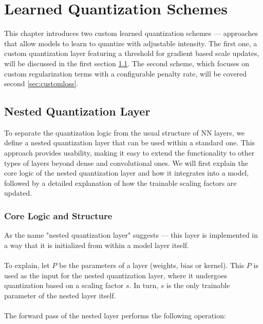 \chapter{Learned Quantization\label{cha:chapter3} Schemes}
This chapter introduces two custom learned quantization schemes — approaches that allow models to learn to quantize
with adjustable intensity. The first one, a custom quantization layer featuring a threshold for gradient based scale updates,
will be discussed in the first section \ref{sec:nestedquantizationlayer}. The second scheme, which focuses on custom regularization terms with a configurable penalty rate,
will be covered second \ref{sec:customloss}.


\section{Nested Quantization Layer}
\label{sec:nestedquantizationlayer}
To separate the quantization logic from the usual structure of NN layers,
we define a nested quantization layer that can be used within a standard one. 
This approach provides usability, making it easy to extend the functionality to other types of layers beyond dense and convolutional ones.
We will first explain the core logic of the nested quantization layer and how it integrates into a model,
followed by a detailed explanation of how the trainable scaling factors are updated.



\subsection{Core Logic and Structure}
\label{subsec:quantizedconvolutional}

As the name "nested quantization layer" suggests —
this layer is implemented in a way that it is initialized from within a model layer itself.
\\
\\
To explain, let \( P \) be the parameters of a layer (weights, bias or kernel). This \( P \) is used
as the input for the nested quantization layer, where it undergoes quantization based on 
a scaling factor \( s \). In turn, \( s \) is the only trainable parameter of the nested layer itself.
\\
\\
The forward pass of the nested layer performs the following operation:

